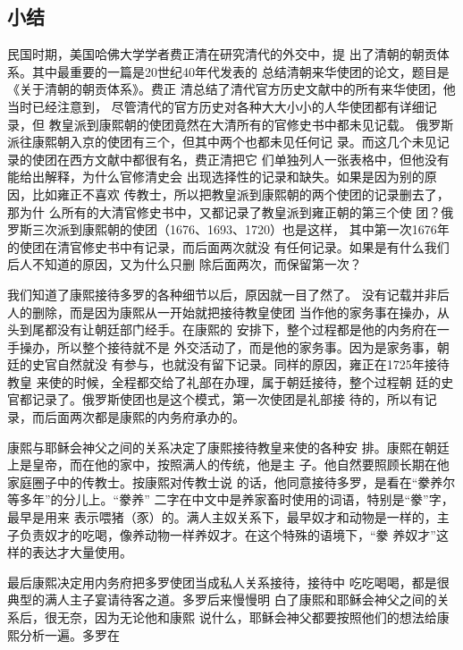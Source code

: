 \subsection{小结}
\par
民国时期，美国哈佛大学学者费正清在研究清代的外交中，提%
出了清朝的朝贡体系。其中最重要的一篇是20世纪40年代发表的%
总结清朝来华使团的论文，题目是《关于清朝的朝贡体系》。费正%
清总结了清代官方历史文献中的所有来华使团，他当时已经注意到，%
尽管清代的官方历史对各种大大小小的人华使团都有详细记录，但%
教皇派到康熙朝的使团竟然在大清所有的官修史书中都未见记载。%
俄罗斯派往康熙朝入京的使团有三个，但其中两个也都未见任何记%
录。而这几个未见记录的使团在西方文献中都很有名，费正清把它%
们单独列人一张表格中，但他没有能给出解释，为什么官修清史会%
出现选择性的记录和缺失。如果是因为别的原因，比如雍正不喜欢%
传教士，所以把教皇派到康熙朝的两个使团的记录删去了，那为什%
么所有的大清官修史书中，又都记录了教皇派到雍正朝的第三个使%
团？俄罗斯三次派到康熙朝的使团（1676、1693、1720）也是这样，%
其中第一次1676年的使团在清官修史书中有记录，而后面两次就没%
有任何记录。如果是有什么我们后人不知道的原因，又为什么只删%
除后面两次，而保留第一次？%
\par
我们知道了康熙接待多罗的各种细节以后，原因就一目了然了。%
没有记载并非后人的删除，而是因为康熙从一开始就把接待教皇使团%
当作他的家务事在操办，从头到尾都没有让朝廷部门经手。在康熙的%
安排下，整个过程都是他的内务府在一手操办，所以整个接待就不是%
外交活动了，而是他的家务事。因为是家务事，朝廷的史官自然就没%
有参与，也就没有留下记录。同样的原因，雍正在1725年接待教皇%
来使的时候，全程都交给了礼部在办理，属于朝廷接待，整个过程朝%
廷的史官都记录了。俄罗斯使团也是这个模式，第一次使团是礼部接%
待的，所以有记录，而后面两次都是康熙的内务府承办的。%
\par
康熙与耶稣会神父之间的关系决定了康熙接待教皇来使的各种安%
排。康熙在朝廷上是皇帝，而在他的家中，按照满人的传统，他是主%
子。他自然要照顾长期在他家庭圈子中的传教士。按康熙对传教士说%
的话，他同意接待多罗，是看在“豢养尔等多年”的分儿上。“豢养”%
二字在中文中是养家畜时使用的词语，特别是“豢”字，最早是用来%
表示喂猪（豕）的。满人主奴关系下，最早奴才和动物是一样的，主%
子负责奴才的吃喝，像养动物一样养奴才。在这个特殊的语境下，“豢%
养奴才”这样的表达才大量使用。%
\par
最后康熙决定用内务府把多罗使团当成私人关系接待，接待中%
吃吃喝喝，都是很典型的满人主子宴请待客之道。多罗后来慢慢明%
白了康熙和耶稣会神父之间的关系后，很无奈，因为无论他和康熙%
说什么，耶稣会神父都要按照他们的想法给康熙分析一遍。多罗在%

